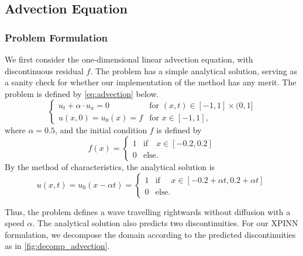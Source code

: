 \subsection{Advection Equation}\label{sec:advection}
\subsubsection{Problem Formulation}
We first consider the one-dimensional linear advection equation, with discontinuous residual $f$.
The problem has a simple analytical solution, serving as a sanity check for whether our implementation of the method has any merit.
The problem is defined by \eqref{eq:advection} below.
\begin{equation}
\begin{cases}
    u_t + \alpha \cdot u_x= 0 &\text{for } (x,t)\in [-1, 1] \times (0, 1] \\ 
    u(x, 0) = u_0(x)= f &\text{for } x \in [-1, 1],
\end{cases}
\label{eq:advection}
\end{equation}
where $\alpha = 0.5$, and the initial condition $f$ is defined by
\begin{equation*}
    f(x) =
    \begin{cases}
        1 &\text{if} \quad x \in [-0.2, 0.2] \\
        0 &\text{else}.
    \end{cases}
\end{equation*}
By the method of characteristics, the analytical solution is
\begin{equation}
    u(x,t) = u_0(x-\alpha t)=
    \begin{cases}
        1 &\text{if } \quad x \in [-0.2 + \alpha t, 0.2 + \alpha t] \\
        0 &\text{else}.
    \end{cases}
\end{equation}

Thus, the problem defines a wave travelling rightwards without diffusion with a speed $\alpha$.
The analytical solution also predicts two discontinuities.
For our XPINN formulation, we decompose the domain according to the predicted discontinuities as in \autoref{fig:decomp_advection}.

